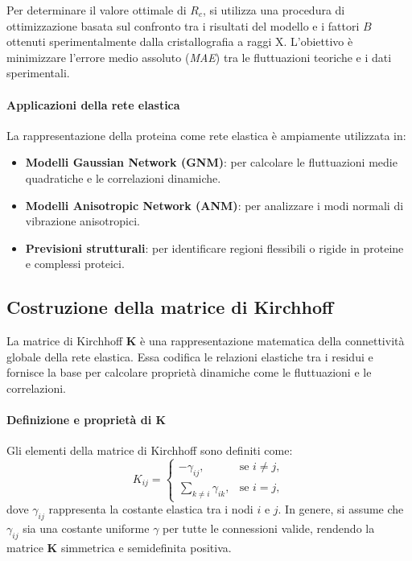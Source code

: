 \documentclass[Lau,binding=0.6cm,oneside,noexaminfo]{sapthesis}
\begin{document}
Per determinare il valore ottimale di $R_c$, si utilizza una procedura di ottimizzazione basata sul confronto tra i risultati del modello e i fattori $B$ ottenuti sperimentalmente dalla cristallografia a raggi X. L’obiettivo è minimizzare l’errore medio assoluto (\textit{MAE}) tra le fluttuazioni teoriche e i dati sperimentali.

\paragraph{Applicazioni della rete elastica}
La rappresentazione della proteina come rete elastica è ampiamente utilizzata in:
\begin{itemize}
    \item \textbf{Modelli Gaussian Network (GNM)}: per calcolare le fluttuazioni medie quadratiche e le correlazioni dinamiche.
    \item \textbf{Modelli Anisotropic Network (ANM)}: per analizzare i modi normali di vibrazione anisotropici.
    \item \textbf{Previsioni strutturali}: per identificare regioni flessibili o rigide in proteine e complessi proteici.
\end{itemize}

\subsection{Costruzione della matrice di Kirchhoff}

La matrice di Kirchhoff $\mathbf{K}$ è una rappresentazione matematica della connettività globale della rete elastica. Essa codifica le relazioni elastiche tra i residui e fornisce la base per calcolare proprietà dinamiche come le fluttuazioni e le correlazioni.

\paragraph{Definizione e proprietà di $\mathbf{K}$}
Gli elementi della matrice di Kirchhoff sono definiti come:
\begin{equation}
K_{ij} =
\begin{cases}
-\gamma_{ij}, & \text{se } i \neq j, \\
\sum_{k \neq i} \gamma_{ik}, & \text{se } i = j,
\end{cases}
\end{equation}
dove $\gamma_{ij}$ rappresenta la costante elastica tra i nodi $i$ e $j$. In genere, si assume che $\gamma_{ij}$ sia una costante uniforme $\gamma$ per tutte le connessioni valide, rendendo la matrice $\mathbf{K}$ simmetrica e semidefinita positiva.
\end{document}

